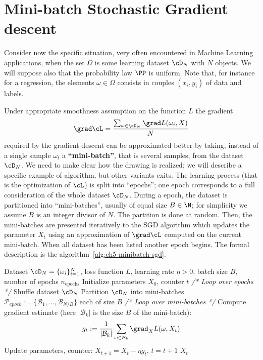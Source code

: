\section{Mini-batch Stochastic Gradient descent}
\label{sec:ch5-minibatch-sgd}

Consider now the specific situation, very often encountered in Machine Learning applications, when the set $\Omega$ is some learning dataset $\cD_N$ with $N$ objects. We will suppose also that the probability law $\PP$ is uniform. Note that, for instance for a regression, the elements $\omega \in \Omega$ consists in couples $(x_i, y_i)$ of data and labels.

Under appropriate smoothness assumption on the function $L$ the gradient
\begin{equation}\label{eq:ch5-full-gradient}
\grad \cL = \frac{\sum_{\omega \in \cD_N} \grad L(\omega_i, X)}{N}
\end{equation}
required by the gradient descent can be approximated better by taking, instead of a single sample $\omega_t$ a \textbf{``mini-batch''}, that is several samples, from the dataset $\cD_N$. We need to make clear how the drawing is realized; we will describe a specific example of algorithm, but other variants exits. The learning process (that is the optimization of $\cL$) is split into ``epochs''; one epoch corresponds to a full consideration of the whole dataset $\cD_N$. During a epoch, the dataset is partitioned into ``mini-batches'', usually of equal size $B \in \N$; for simplicity we assume $B$ is an integer divisor of $N$. The partition is done at random. Then, the mini-batches are presented iteratively to the SGD algorithm which updates the parameter $X_t$ using an approximation of $\grad \cL$ computed on the current mini-batch. When all dataset has been listed another epoch begins. The formal description is the algorithm~\ref{alg:ch5-minibatch-sgd}.

\begin{algorithm}[h]
\caption{Mini-Batch Stochastic Gradient Descent (SGD)}\label{alg:ch5-minibatch-sgd}
\begin{algorithmic}[1]
\Require Dataset $\cD_N = \{\omega_i\}_{i=1}^{N}$, loss function $L$, learning rate $\eta > 0$, batch size $B$, number of epochs $n_{\text{epochs}}$
\State Initialize parameters $X_0$, counter $t$
\State \textit{/* Loop over epochs */}
    \State Shuffle dataset $\cD_N$
    \State Partition $\cD_N$ into mini-batches $\mathcal{P}_{epoch} := \{\mathcal{B}_1, \ldots, \mathcal{B}_{N/B}\}$ each of size $B$
    \State \textit{/* Loop over mini-batches */}
        \State Compute gradient estimate (here $|\mathcal{B}_k|$ is the size $B$ of the mini-batch):
        \begin{equation}\label{eq:ch5-minibatch-gradient}
        g_t := \frac{1}{|\mathcal{B}_k|} \sum_{\omega \in \mathcal{B}_k} \grad_X L(\omega, X_t)
        \end{equation}
        \State Update parameters, counter: $X_{t+1} = X_t - \eta g_t$, $t = t + 1$
    \EndFor
\EndFor
\State \Return $X_t$
\end{algorithmic}
\end{algorithm}

